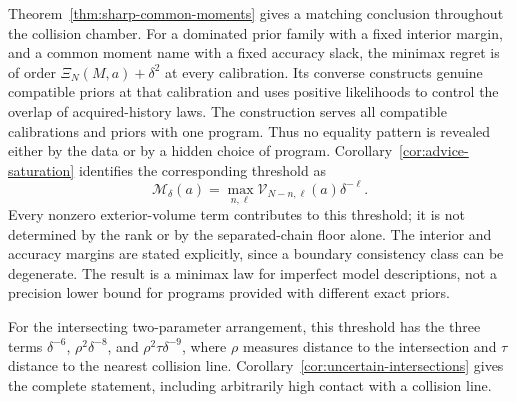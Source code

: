 Theorem~\ref{thm:sharp-common-moments} gives a matching conclusion
throughout the collision chamber. For a dominated prior family with a
fixed interior margin, and a common moment name with a fixed accuracy
slack, the minimax regret is of order $\Xi_N(M,a)+\delta^2$ at every
calibration. Its converse constructs genuine compatible priors at that
calibration and uses positive likelihoods to control the overlap of
acquired-history laws. The construction serves all compatible
calibrations and priors with one program. Thus no equality pattern is
revealed either by the data or by a hidden choice of program.
Corollary~\ref{cor:advice-saturation} identifies the corresponding
threshold as
\[
 \mathcal M_\delta(a)=\max_{n,\ell}
       \mathcal V_{N-n,\ell}(a)\delta^{-\ell}.
\]
Every nonzero exterior-volume term contributes to this threshold; it is
not determined by the rank or by the separated-chain floor alone.
The interior and accuracy margins are stated explicitly, since a
boundary consistency class can be degenerate. The result is a minimax
law for imperfect model descriptions, not a precision lower bound for
programs provided with different exact priors.

For the intersecting two-parameter arrangement, this threshold has the
three terms $\delta^{-6}$, $\rho^2\delta^{-8}$, and
$\rho^2\tau\delta^{-9}$, where $\rho$ measures distance to the
intersection and $\tau$ distance to the nearest collision line.
Corollary~\ref{cor:uncertain-intersections} gives the complete statement,
including arbitrarily high contact with a collision line.
